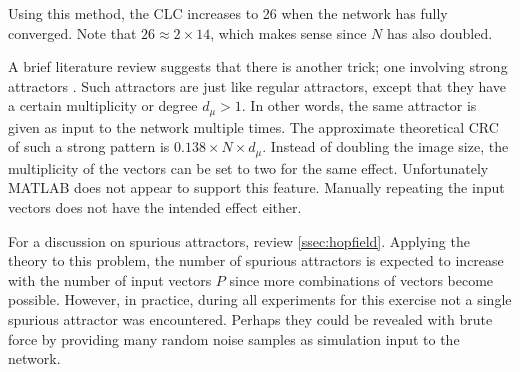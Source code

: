 \documentclass[a4, 10pt, twoside, twocolumn]{article}
\numberwithin{figure}{section}
\begin{document}
Using this method, the CLC increases to 26 when the network has fully converged. Note that $26 \approx 2 \times 14$, which makes sense since $N$ has also doubled.

A brief literature review suggests that there is another trick; one involving strong attractors \cite{edalat2013strong}. Such attractors are just like regular attractors, except that they have a certain multiplicity or degree $d_\mu > 1$. In other words, the same attractor is given as input to the network multiple times. The approximate theoretical CRC of such a strong pattern is $0.138 \times N \times d_\mu$. Instead of doubling the image size, the multiplicity of the vectors can be set to two for the same effect. Unfortunately MATLAB does not appear to support this feature. Manually  repeating the input vectors does not have the intended effect either.

For a discussion on spurious attractors, review \autoref{ssec:hopfield}. Applying the theory to this problem, the number of spurious attractors is expected to increase with the number of input vectors $P$ since more combinations of vectors become possible. However, in practice, during all experiments for this exercise not a single spurious attractor was encountered. Perhaps they could be revealed with brute force by providing many random noise samples as simulation input to the network.




\clearpage
\onecolumn
\end{document}
